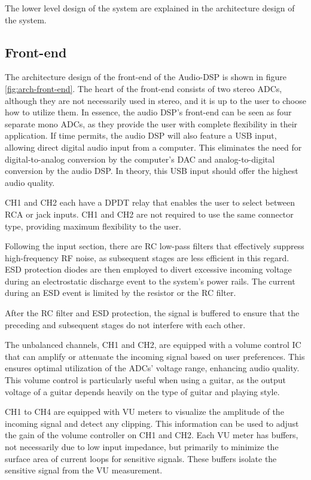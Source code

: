 The lower level design of the system are explained in the architecture design of the system. 

\subsection{Front-end}
The architecture design of the front-end of the Audio-DSP is shown in figure \ref{fig:arch-front-end}. The heart of the front-end consists of two stereo ADCs, although they are not necessarily used in stereo, and it is up to the user to choose how to utilize them. In essence, the audio DSP's front-end can be seen as four separate mono ADCs, as they provide the user with complete flexibility in their application. If time permits, the audio DSP will also feature a USB input, allowing direct digital audio input from a computer. This eliminates the need for digital-to-analog conversion by the computer's DAC and analog-to-digital conversion by the audio DSP. In theory, this USB input should offer the highest audio quality.

CH1 and CH2 each have a DPDT relay that enables the user to select between RCA or jack inputs. CH1 and CH2 are not required to use the same connector type, providing maximum flexibility to the user.

Following the input section, there are RC low-pass filters that effectively suppress high-frequency RF noise, as subsequent stages are less efficient in this regard. ESD protection diodes are then employed to divert excessive incoming voltage during an electrostatic discharge event to the system's power rails. The current during an ESD event is limited by the resistor or the RC filter.

After the RC filter and ESD protection, the signal is buffered to ensure that the preceding and subsequent stages do not interfere with each other.

The unbalanced channels, CH1 and CH2, are equipped with a volume control IC that can amplify or attenuate the incoming signal based on user preferences. This ensures optimal utilization of the ADCs' voltage range, enhancing audio quality. This volume control is particularly useful when using a guitar, as the output voltage of a guitar depends heavily on the type of guitar and playing style.

CH1 to CH4 are equipped with VU meters to visualize the amplitude of the incoming signal and detect any clipping. This information can be used to adjust the gain of the volume controller on CH1 and CH2. Each VU meter has buffers, not necessarily due to low input impedance, but primarily to minimize the surface area of current loops for sensitive signals. These buffers isolate the sensitive signal from the VU measurement.

